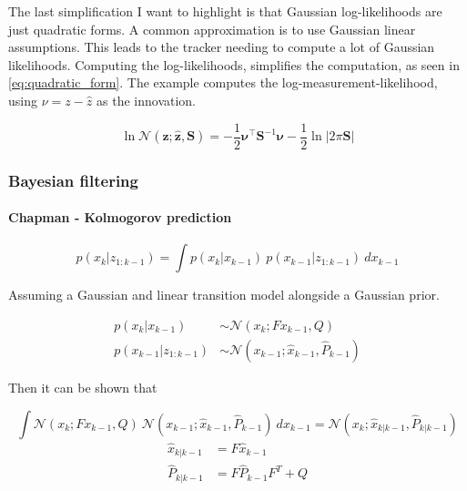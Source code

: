 \medskip

The last simplification I want to highlight is that Gaussian log-likelihoods are just quadratic forms. A common approximation is to use Gaussian linear assumptions. This leads to the tracker needing to compute a lot of Gaussian likelihoods. Computing the log-likelihoods, simplifies the computation, as seen in \autoref{eq:quadratic_form}. The example computes the log-measurement-likelihood, using $\nu = z - \hat{z}$ as the innovation.

\begin{equation}
    \ln \mathcal{N}(\mathbf{z}; \hat{\mathbf{z}}, \mathbf{S}) = -\frac{1}{2} \boldsymbol{\nu}^\top \mathbf{S}^{-1} \boldsymbol{\nu} - \frac{1}{2} \ln \lvert 2\pi \mathbf{S} \rvert
    \label{eq:quadratic_form}
\end{equation}

\subsubsection{Bayesian filtering}
\label{bayesian_filtering}

\paragraph{Chapman - Kolmogorov prediction}

\begin{equation}
    p(x_k \vert z_{1:k-1}) = \int p(x_k \vert x_{k-1}) \: p(x_{k-1} \vert z_{1:k-1}) \: dx_{k-1}
\end{equation}

Assuming a Gaussian and linear transition model alongside a Gaussian prior.

\begin{align}
p(x_k \vert x_{k-1}) &\sim \mathcal{N}(x_k; F x_{k-1}, Q) \\
p(x_{k-1} \vert z_{1:k-1}) &\sim \mathcal{N}(x_{k-1}; \hat{x}_{k-1}, \hat{P}_{k-1})
\end{align}

Then it can be shown that

\begin{equation}
    \int \mathcal{N}(x_k; F x_{k-1}, Q) \: \mathcal{N}(x_{k-1}; \hat{x}_{k-1}, \hat{P}_{k-1}) \: dx_{k-1} = \mathcal{N}(x_k; \hat{x}_{k \vert k-1}, \hat{P}_{k \vert k-1})
\end{equation}
\begin{align}
    \hat{x}_{k \vert k-1} &= F \hat{x}_{k-1} \\
    \hat{P}_{k \vert k-1} &= F \hat{P}_{k-1} F^T + Q
\end{align}

